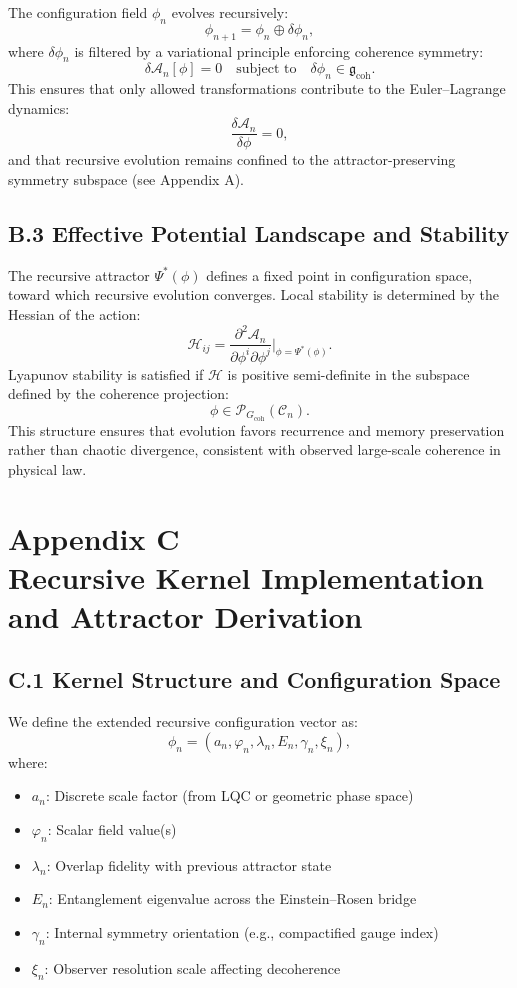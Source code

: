 \documentclass[11pt]{article}
\begin{document}
The configuration field $\phi_n$ evolves recursively:
\[
\phi_{n+1} = \phi_n \oplus \delta \phi_n,
\]
where $\delta \phi_n$ is filtered by a variational principle enforcing coherence symmetry:
\[
\delta \mathcal{A}_n[\phi] = 0 \quad \text{subject to} \quad \delta \phi_n \in \mathfrak{g}_{\text{coh}}.
\]
This ensures that only allowed transformations contribute to the Euler–Lagrange dynamics:
\[
\frac{\delta \mathcal{A}_n}{\delta \phi} = 0,
\]
and that recursive evolution remains confined to the attractor-preserving symmetry subspace (see Appendix A).

\subsection*{B.3 Effective Potential Landscape and Stability}

The recursive attractor $\Psi^*(\phi)$ defines a fixed point in configuration space, toward which recursive evolution converges. Local stability is determined by the Hessian of the action:
\[
\mathcal{H}_{ij} = \frac{\partial^2 \mathcal{A}_n}{\partial \phi^i \partial \phi^j} \Bigg|_{\phi = \Psi^*(\phi)}.
\]
Lyapunov stability is satisfied if $\mathcal{H}$ is positive semi-definite in the subspace defined by the coherence projection:
\[
\phi \in \mathcal{P}_{G_{\text{coh}}}(\mathcal{C}_n).
\]
This structure ensures that evolution favors recurrence and memory preservation rather than chaotic divergence, consistent with observed large-scale coherence in physical law.


\section*{Appendix C\\Recursive Kernel Implementation and Attractor Derivation}
\label{appendix:C}

\subsection*{C.1 Kernel Structure and Configuration Space}

We define the extended recursive configuration vector as:
\[
\phi_n = (a_n, \varphi_n, \lambda_n, E_n, \gamma_n, \xi_n),
\]
where:

\begin{itemize}[leftmargin=1.5em]
  \item $a_n$: Discrete scale factor (from LQC or geometric phase space)~\cite{ashtekar2006quantum}
  \item $\varphi_n$: Scalar field value(s)
  \item $\lambda_n$: Overlap fidelity with previous attractor state
  \item $E_n$: Entanglement eigenvalue across the Einstein–Rosen bridge~\cite{maldacena2013cool}
  \item $\gamma_n$: Internal symmetry orientation (e.g., compactified gauge index)
  \item $\xi_n$: Observer resolution scale affecting decoherence~\cite{zurek2003decoherence}
\end{itemize}
\end{document}
